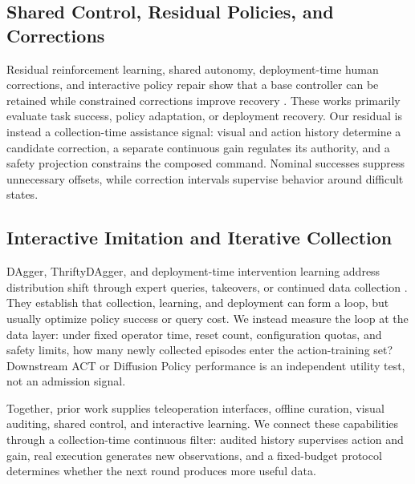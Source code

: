 \subsection{Shared Control, Residual Policies, and Corrections}
Residual reinforcement learning, shared autonomy, deployment-time human
corrections, and interactive policy repair show that a base controller can be
retained while constrained corrections improve recovery
\citep{johanninkResidualReinforcementLearning2019,javdaniSharedAutonomyHindsight2015,liuRobotLearningJob2023,luoPreciseDexterousRobotic,welteFlowCorrectEfficientInteractive2026a}.
These works primarily evaluate task success, policy adaptation, or deployment
recovery. Our residual is instead a collection-time assistance signal: visual
and action history determine a candidate correction, a separate continuous
gain regulates its authority, and a safety projection constrains the composed
command. Nominal successes suppress unnecessary offsets, while correction
intervals supervise behavior around difficult states.

\subsection{Interactive Imitation and Iterative Collection}
DAgger, ThriftyDAgger, and deployment-time intervention learning address
distribution shift through expert queries, takeovers, or continued data
collection
\citep{rossReductionImitationLearning2011,hoqueThriftyDAggerBudgetAwareNovelty2021,liuRobotLearningJob2023,luoPreciseDexterousRobotic}.
They establish that collection, learning, and deployment can form a loop, but
usually optimize policy success or query cost. We instead measure the loop at
the data layer: under fixed operator time, reset count, configuration quotas,
and safety limits, how many newly collected episodes enter the action-training
set? Downstream ACT or Diffusion Policy performance is an independent utility
test, not an admission signal.

Together, prior work supplies teleoperation interfaces, offline curation,
visual auditing, shared control, and interactive learning. We connect these
capabilities through a collection-time continuous filter: audited history
supervises action and gain, real execution generates new observations, and a
fixed-budget protocol determines whether the next round produces more useful
data.
